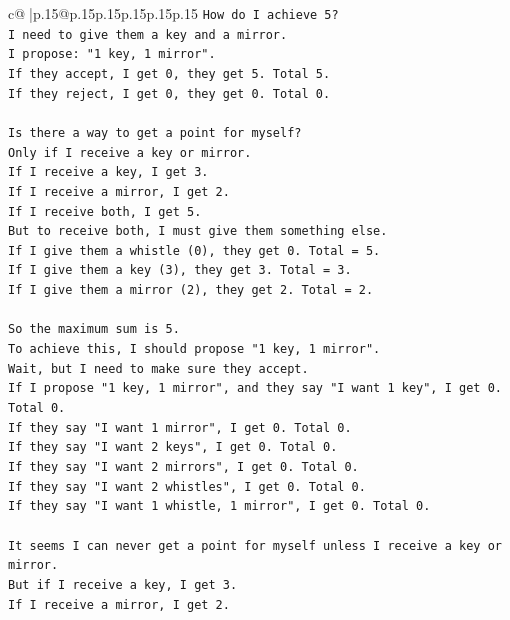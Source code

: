 \documentclass{article}
\begin{document}
{\begin{supertabular}{c@{$\;$}|p{.15\linewidth}@{}p{.15\linewidth}p{.15\linewidth}p{.15\linewidth}p{.15\linewidth}p{.15\linewidth}}
{{{\texttt{How do I achieve 5?} \\
\texttt{I need to give them a key and a mirror.} \\
\texttt{I propose: "1 key, 1 mirror".} \\
\texttt{If they accept, I get 0, they get 5. Total 5.} \\
\texttt{If they reject, I get 0, they get 0. Total 0.} \\
\\ 
\texttt{Is there a way to get a point for myself?} \\
\texttt{Only if I receive a key or mirror.} \\
\texttt{If I receive a key, I get 3.} \\
\texttt{If I receive a mirror, I get 2.} \\
\texttt{If I receive both, I get 5.} \\
\texttt{But to receive both, I must give them something else.} \\
\texttt{If I give them a whistle (0), they get 0. Total = 5.} \\
\texttt{If I give them a key (3), they get 3. Total = 3.} \\
\texttt{If I give them a mirror (2), they get 2. Total = 2.} \\
\\ 
\texttt{So the maximum sum is 5.} \\
\texttt{To achieve this, I should propose "1 key, 1 mirror".} \\
\texttt{Wait, but I need to make sure they accept.} \\
\texttt{If I propose "1 key, 1 mirror", and they say "I want 1 key", I get 0. Total 0.} \\
\texttt{If they say "I want 1 mirror", I get 0. Total 0.} \\
\texttt{If they say "I want 2 keys", I get 0. Total 0.} \\
\texttt{If they say "I want 2 mirrors", I get 0. Total 0.} \\
\texttt{If they say "I want 2 whistles", I get 0. Total 0.} \\
\texttt{If they say "I want 1 whistle, 1 mirror", I get 0. Total 0.} \\
\\ 
\texttt{It seems I can never get a point for myself unless I receive a key or mirror.} \\
\texttt{But if I receive a key, I get 3.} \\
\texttt{If I receive a mirror, I get 2.} \\
}}}
\end{supertabular}}
\end{document}
